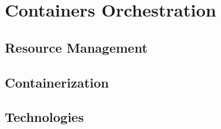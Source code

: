 \chapter{Containers Orchestration}
\label{chp:containers-orchestration}


\lipsum[1]


\section{Resource Management}
\label{sec:containers-orchestration-resource-management}

\lipsum[1]


\section{Containerization}
\label{sec:containers-orchestration-containerization}

\lipsum[1]


\section{Technologies}
\label{sec:containers-orchestration-technologies}

\lipsum[1]